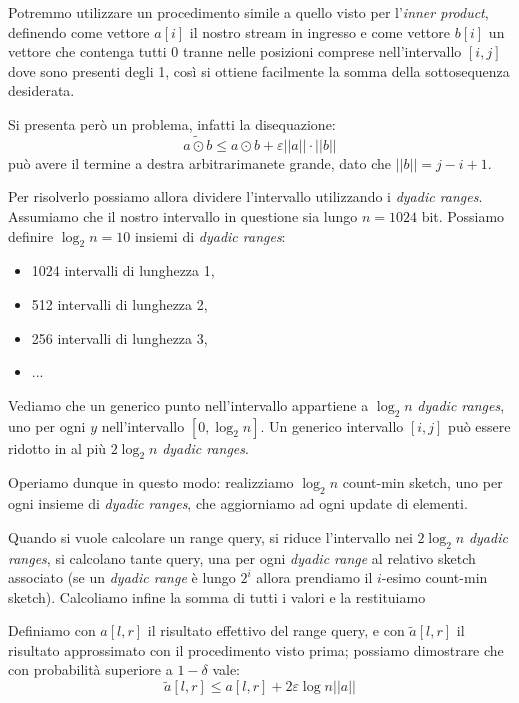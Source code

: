 \documentclass[a4paper,11pt]{book}
\begin{document}
Potremmo utilizzare un procedimento simile a quello visto per l'\emph{inner product}, definendo come vettore $a[i]$ il nostro stream in ingresso e come vettore $b[i]$ un vettore che contenga tutti 0 tranne nelle posizioni comprese nell'intervallo $[i,j]$ dove sono presenti degli 1, cos\`i si ottiene facilmente la somma della sottosequenza desiderata.

Si presenta per\`o un problema, infatti la disequazione: $$ \widetilde{a \odot b} \leq a \odot b + \varepsilon||a||\cdot||b||$$ pu\`o avere il termine a destra arbitrarimanete grande, dato che $||b|| = j - i + 1$.

Per risolverlo possiamo allora dividere l'intervallo utilizzando i \emph{dyadic ranges}. Assumiamo che il nostro intervallo in questione sia lungo $n = 1024$ bit. Possiamo definire $\log_2 n = 10$ insiemi di \emph{dyadic ranges}:
\begin{itemize}
\item 1024 intervalli di lunghezza 1,
\item 512 intervalli di lunghezza 2,
\item 256 intervalli di lunghezza 3,
\item ...
\end{itemize}

Vediamo che un generico punto nell'intervallo appartiene a $\log_2 n$ \emph{dyadic ranges}, uno per ogni $y$ nell'intervallo $[0, \log_2 n]$. Un generico intervallo $[i,j]$ pu\`o essere ridotto in al pi\`u $2 \log_2 n$ \emph{dyadic ranges}.

Operiamo dunque in questo modo: realizziamo $\log_2 n$ count-min sketch, uno per ogni insieme di \emph{dyadic ranges}, che aggiorniamo ad ogni update di elementi.

Quando si vuole calcolare un range query, si riduce l'intervallo nei $2 \log_2 n$ \emph{dyadic ranges}, si calcolano tante query, una per ogni \emph{dyadic range} al relativo sketch associato (se un \emph{dyadic range} \`e lungo $2^i$ allora prendiamo il $i$-esimo count-min sketch). Calcoliamo infine la somma di tutti i valori e la restituiamo

Definiamo con $a[l,r]$ il risultato effettivo del range query, e con $\tilde{a}[l,r]$ il risultato approssimato con il procedimento visto prima; possiamo dimostrare che con probabilit\`a superiore a $1 - \delta$ vale: $$\tilde{a}[l,r] \leq a[l,r] + 2\varepsilon \log n ||a|| $$
\end{document}
